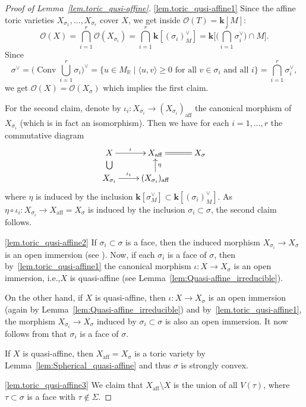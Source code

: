 \documentclass[11pt]{article}
\newcommand{\ie}{i.e.,\xspace}
\newcommand{\skpt}{\smallskip}
\numberwithin{equation}{section}
\let\mathcal\mathscr
\let\oldvee\vee
\renewcommand{\vee}{{\scriptscriptstyle\oldvee}}
\theoremstyle{plain}
\theoremstyle{definition}
\DeclareMathOperator{\aff}{aff}
\DeclareMathOperator{\Conv}{Conv}
\newcommand{\OO}{\mathcal{O}}
\newcommand{\RR}{\mathbb{R}}
\newcommand{\kk}{{\boldsymbol{k}}}
\newcommand{\set}[2]{\{#1 \mid #2\}}
\begin{document}
\skpt
\begin{proof}[Proof of Lemma~\ref{lem.toric_qusi-affine}]
\eqref{lem.toric_qusi-affine1}
Since the affine toric varieties $X_{\sigma_1}, \ldots, X_{\sigma_r}$
cover $X$, we get inside \hbox{$\OO(T)\!=\!\kk[M]$}:
\[
\OO(X) = \bigcap_{i=1}^r \OO(X_{\sigma_i}) =
\bigcap_{i=1}^r \kk[(\sigma_i)_M^{\vee}] =
\kk\biggl[ \biggl( \bigcap_{i=1}^r \sigma_i^{\vee} \biggr) \cap M \biggr].
\]
Since
\[
\sigma^\vee = \biggl(\Conv \bigcup_{i=1}^r \sigma_i\biggr)^\oldvee =
\set{u \in M_{\RR}}{\textrm{$\langle u, v \rangle \geq 0$ for all $v \in \sigma_i$ and all $i$}} =
\bigcap_{i=1}^r \sigma_i^\vee,
\]
we get $\OO(X) = \OO(X_\sigma)$ which implies the first claim.

For the second claim, denote by $\iota_i \colon X_{\sigma_i} \to (X_{\sigma_i})_{\aff}$
the canonical morphism of $X_{\sigma_i}$
(which is in fact an isomorphism). Then we have for each
$i=1, \ldots, r$ the commutative diagram
\[
\xymatrix@R=15pt{
X \ar[r]^-{\iota} & X_{\aff} \ar@{=}[r] & X_\sigma \\
X_{\sigma_i} \ar@{}[u] |-{\bigcup} \ar[r]^-{\iota_i} & (X_{\sigma_i})_{\aff} \ar[u]_-{\eta}
}
\]
where $\eta$ is induced by the inclusion $\kk[\sigma^{\vee}_M] \subset \kk[(\sigma_i)^\vee_M]$.
As $\eta \circ \iota_i \colon X_{\sigma_i} \to X_{\aff} = X_{\sigma}$
is induced by the inclusion $\sigma_i \subset \sigma$, the second claim follows.

\eqref{lem.toric_qusi-affine2}
If $\sigma_i \subset \sigma$ is a face, then
the induced morphism $X_{\sigma_i} \to X_{\sigma}$ is an open immersion
(see \cite[\S1.3 Lem.]{Fu1993Introduction-to-to}). Now, if each $\sigma_i$
is a face of $\sigma$, then by~\eqref{lem.toric_qusi-affine1} the canonical morphism
$\iota \colon X \to X_\sigma$ is an open immersion, \ie $X$ is quasi-affine (see Lemma~\ref{lem:Quasi-affine_irreducible}).

On the other hand, if $X$ is quasi-affine, then $\iota \colon X \to X_\sigma$ is an open immersion
(again by Lemma~\ref{lem:Quasi-affine_irreducible}) and by~\eqref{lem.toric_qusi-affine1}, the
morphism $X_{\sigma_i} \to X_{\sigma}$ induced by $\sigma_i \subset \sigma$
is also an open immersion. It now follows from
\cite[\S1.3 Exer.\,p.\,18]{Fu1993Introduction-to-to} that $\sigma_i$ is a face of $\sigma$.

If $X$ is quasi-affine, then $X_{\aff} = X_{\sigma}$ is a toric variety by Lemma~\ref{lem:Spherical_quasi-affine} and thus $\sigma$ is strongly convex.

\eqref{lem.toric_qusi-affine3}
We claim that $X_{\aff} \setminus X$ is the union
of all $V(\tau)$, where $\tau \subset \sigma$ is a face with $\tau \not\in \Sigma$.


\end{proof}
\end{document}
